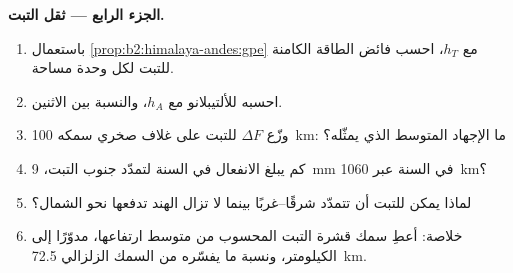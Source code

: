 \begin{problem}
\noindent\textbf{الجزء الرابع --- ثقل التبت.}
\begin{enumerate}[resume]
\item باستعمال \cref{prop:b2:himalaya-andes:gpe} مع $h_T$، احسب فائض الطاقة
الكامنة للتبت لكل وحدة مساحة.
\item احسبه للألتيبلانو مع $h_A$، والنسبة بين الاثنين.
\item وزّع $\Delta F$ للتبت على غلاف صخري سمكه \qty{100}{km}: ما الإجهاد المتوسط الذي
يمثّله؟
\item كم يبلغ الانفعال في السنة لتمدّد جنوب التبت، \qty{9}{mm} في السنة عبر \qty{1060}{km}؟
\item لماذا يمكن للتبت أن تتمدّد شرقًا--غربًا بينما لا تزال الهند تدفعها نحو الشمال؟
\item خلاصة: أعطِ سمك قشرة التبت المحسوب من متوسط ارتفاعها، مدوّرًا
إلى الكيلومتر، ونسبة ما يفسّره من السمك الزلزالي \qty{72.5}{km}.
\end{enumerate}
\end{problem}
